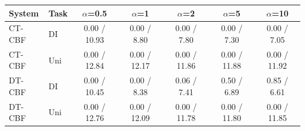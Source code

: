 \begin{tabular}{llccccc}
\hline
System & Task & $\alpha$=0.5 & $\alpha$=1 & $\alpha$=2 & $\alpha$=5 & $\alpha$=10 \\
\hline
CT-CBF & DI & 0.00 / 10.93 & 0.00 / 8.80 & 0.00 / 7.80 & 0.00 / 7.30 & 0.00 / 7.05 \\
CT-CBF & Uni & 0.00 / 12.84 & 0.00 / 12.17 & 0.00 / 11.86 & 0.00 / 11.88 & 0.00 / 11.92 \\
DT-CBF & DI & 0.00 / 10.45 & 0.00 / 8.38 & 0.06 / 7.41 & 0.50 / 6.89 & 0.85 / 6.61 \\
DT-CBF & Uni & 0.00 / 12.76 & 0.00 / 12.09 & 0.00 / 11.78 & 0.00 / 11.80 & 0.00 / 11.85 \\
\hline
\end{tabular}
